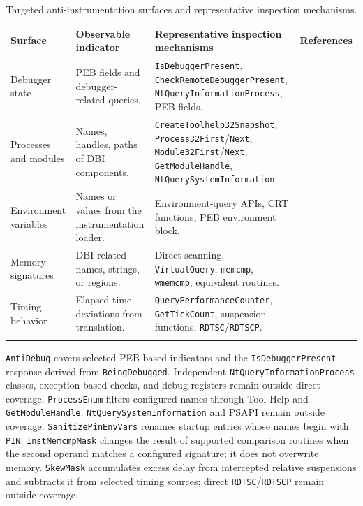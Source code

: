 \documentclass[pdflatex,sn-mathphys-num]{sn-jnl}
\theoremstyle{thmstyleone}
\theoremstyle{thmstyletwo}
\theoremstyle{thmstylethree}
\begin{document}
\begin{table}[t]
\caption{Targeted anti-instrumentation surfaces and representative inspection mechanisms.}
\label{tab:detection_surfaces}
\centering
\begingroup
\footnotesize
\setlength{\tabcolsep}{3pt}
\renewcommand{\arraystretch}{1.15}
\begin{tabularx}{\textwidth}{@{}
>{\raggedright\arraybackslash}p{}
>{\raggedright\arraybackslash}p{}
>{\raggedright\arraybackslash}X
>{\raggedright\arraybackslash}p{}
@{}}
\toprule
\textbf{Surface} & \textbf{Observable indicator} & \textbf{Representative inspection mechanisms} & \textbf{References} \\
\midrule
Debugger state & PEB fields and debugger-related queries. &
\texttt{IsDebuggerPresent}, \texttt{CheckRemoteDebuggerPresent},
\texttt{NtQueryInformationProcess}, PEB fields. &
\cite{park2024detection,lee2021bypassing,park2019antidebug,norby2025measurement} \\
\addlinespace
Processes and modules & Names, handles, paths of DBI components. &
\texttt{CreateToolhelp32Snapshot}, \texttt{Process32First}/\texttt{Next},
\texttt{Module32First}/\texttt{Next}, \texttt{GetModuleHandle},
\texttt{NtQuerySystemInformation}. &
\cite{polino2017measuring,park2024detection,falcon2012dynamic} \\
\addlinespace
Environment variables & Names or values from the instrumentation loader. &
Environment-query APIs, CRT functions, PEB environment block. &
\cite{GiorgioC2022,polino2017measuring,park2024detection} \\
\addlinespace
Memory signatures & DBI-related names, strings, or regions. &
Direct scanning, \texttt{VirtualQuery}, \texttt{memcmp}, \texttt{wmemcmp},
equivalent routines. &
\cite{delia2019sok,delia2022evaluating,palmaro2021memory} \\
\addlinespace
Timing behavior & Elapsed-time deviations from translation. &
\texttt{QueryPerformanceCounter}, \texttt{GetTickCount}, suspension
functions, \texttt{RDTSC}/\texttt{RDTSCP}. &
\cite{park2024detection,bruening2012transparent,oyama2019rdtsc} \\
\botrule
\end{tabularx}
\endgroup
\end{table}

\texttt{AntiDebug} covers selected PEB-based indicators and the \texttt{IsDebuggerPresent} response derived from \texttt{BeingDebugged}. Independent \texttt{NtQueryInformationProcess} classes, exception-based checks, and debug registers remain outside direct coverage. \texttt{ProcessEnum} filters configured names through Tool Help and \texttt{GetModuleHandle}; \texttt{NtQuerySystemInformation} and PSAPI remain outside coverage. \texttt{SanitizePinEnvVars} renames startup entries whose names begin with \texttt{PIN}. \texttt{InstMemcmpMask} changes the result of supported comparison routines when the second operand matches a configured signature; it does not overwrite memory. \texttt{SkewMask} accumulates excess delay from intercepted relative suspensions and subtracts it from selected timing sources; direct \texttt{RDTSC}/\texttt{RDTSCP} remain outside coverage.
\end{document}

